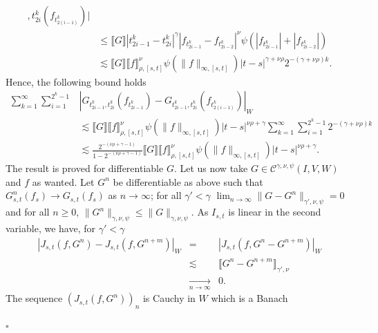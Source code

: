 \documentclass[a4paper,11pt]{article}
\newenvironment{proof}{{\sc Proof.}}{\hfill$\square$}
\newcommand{\CC}{\mathscr C}
\begin{document}
\begin{proof}
\begin{equation*}
\begin{split}
{    ,t_{2i}^{k}} (f_{t_{2(i-1)}^{k}} ) |  \\ & \leqslant  \llbracket G
    \rrbracket | t_{2i-1}^{k} -t^{k}_{2i} |^{\gamma} | f_{t_{2i-1}^{k}}
    -f_{t_{2i-2}^{k}} |^{\nu} \psi ( | f_{t_{2i-1}^{k}} | + | f_{t_{2i-2}^{k}}
    | )\\
    & \lesssim  \llbracket G \rrbracket \llbracket f \rrbracket^{\nu}_{\rho
    , [s,t]} \psi ( \|f\|_{\infty ,[s,t]} ) |t-s|^{\gamma + \nu \rho} 2^{- (
    \gamma + \nu \rho ) k}.
    \end{split}
    \end{equation*}
  Hence, the following bound holds
  \begin{equation} \begin{split}
       \sum_{k=1}^{\infty} \sum_{i=1}^{2^{k} -1} & |G_{t_{2i-1}^{k}
       ,t_{2i}^{k}} (f_{t_{2i-1}^{k}} )-G_{t_{2i-1}^{k} ,t_{2i}^{k}}
       (f_{t_{2(i-1)}^{k}} )|_{W}\\
       & \lesssim \llbracket G \rrbracket \llbracket f \rrbracket^{\nu}_{\rho
       , [s,t]} \psi ( \| f \|_{\infty ,[s,t]} )  |t-s|^{\nu \rho + \gamma} 
       \sum_{k=1}^{\infty} \sum_{i=1}^{2^{k} -1} 2^{- ( \gamma + \nu \rho )
       k}\\
       & \lesssim \frac{2^{- ( \nu \rho + \gamma -1)}}{1-2^{- ( \nu \rho +
       \gamma -1)}} \llbracket G \rrbracket \llbracket f
       \rrbracket^{\nu}_{\rho , [s,t]} \psi ( \|f\|_{\infty ,[s,t]} ) 
       |t-s|^{\nu \rho + \gamma} .
     \end{split} \end{equation}
  The result is proved for differentiable $G$. Let us now take $G \in \CC^{\gamma , \nu ,
  \psi} (I,V,W)$ and $f$ as wanted. Let $G^{n}$ be differentiable as above such that
  $G_{s,t}^{n} (f_{s} ) \to G_{s,t} (f_{s} )$ as $n \to \infty$; for all
  $\gamma' < \gamma$ $\lim_{n \to \infty} \|G-G^{n} \|_{\gamma' , \nu , \psi}
  =0$ and for all $n \ge 0$, $\|G^{n} \|_{\gamma , \nu , \psi} \leqslant
  \|G\|_{\gamma , \nu , \psi}$. As $I_{s,t}$ is linear in the second variable,
  we have, for $\gamma' < \gamma$
  \begin{eqnarray*}
    |J_{s,t} (f,G^{n} )-J_{s,t} (f,G^{n+m} )|_{W} & = & |J_{s,t} (f,G^{n}
    -G^{n+m} )|_{W}\\
    & \lesssim & \llbracket G^{n} -G^{n+m} \rrbracket_{\gamma' , \nu}\\
    & \underset{n \to \infty}{\to} & 0.
  \end{eqnarray*}
  The sequence $( J_{s,t} (f,G^{n} ) )_{n}$ is Cauchy in $W$ which is a Banach

\end{proof}
\end{document}
